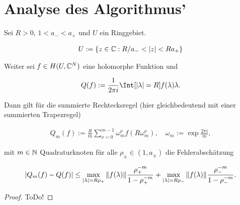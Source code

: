 \section{Analyse des Algorithmus'}

\begin{lemma}

    Sei $R > 0$, $1 < a_- < a_+$ und $U$ ein Ringgebiet.

    \begin{align*}
        U := {\left \{ z \in \mathbb{C}: R / a_- < {\left | z \right |} < R a_+ \right \}}
    \end{align*}

    Weiter sei $f \in H(U, \mathbb{C}^N)$ eine holomorphe Funktion und

    \begin{align*}
        Q(f)
        :=
        \frac{1}{2 \pi i}
        \Int[\abs{\lambda} = R]{f(\lambda)}{\lambda}.
    \end{align*}

    Dann gilt für die summierte Rechtecksregel (hier gleichbedeutend mit einer summierten Trapezregel)

    \begin{align*}
        Q_m(f)
        :=
        \frac{R}{m}
        \sum_{\nu = 0}^{m - 1}
            \omega_m^\nu
            f(R \omega_m^\nu),
        \quad
        \omega_m
        :=
        \exp \frac{2 \pi i}{m},
    \end{align*}

    mit $m \in \mathbb{N}$ Quadraturknoten für alle $\rho_\pm \in (1, a_\pm)$ die Fehlerabschätzung

    \begin{align*}
        {\left | Q_m(f) - Q(f) \right |}
        \leq
        \max_{{\left | \lambda \right |} = R \rho_+}
            {\left \| f(\lambda) \right \|}_{}
        \frac{\rho_+^{-m}}{1 - \rho_+^{-m}}
        +
        \max_{{\left | \lambda \right |} = R \rho_-}
            {\left \| f(\lambda) \right \|}_{}
        \frac{\rho_-^{-m}}{1 - \rho_-^{-m}}.
    \end{align*}

\end{lemma}

\begin{proof}
    ToDo!
\end{proof}

